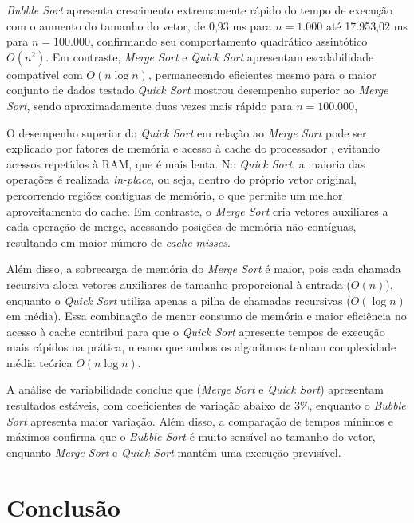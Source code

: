 \documentclass[12pt]{article}
\begin{document}
\textit{Bubble Sort} apresenta crescimento extremamente rápido do tempo de execução com o aumento do tamanho do vetor, de 0,93 ms para $n=1.000$ até 17.953,02 ms para $n=100.000$, confirmando seu comportamento quadrático assintótico $O(n^2)$. Em contraste, \textit{Merge Sort} e \textit{Quick Sort} apresentam escalabilidade compatível com $O(n \log n)$, permanecendo eficientes mesmo para o maior conjunto de dados testado.\textit{Quick Sort} mostrou desempenho superior ao \textit{Merge Sort}, sendo aproximadamente duas vezes mais rápido para $n=100.000$,

O desempenho superior do \textit{Quick Sort} em relação ao \textit{Merge Sort} pode ser explicado por fatores de memória e acesso à cache do processador \cite{prado:2005}, evitando acessos repetidos à RAM, que é mais lenta. No \textit{Quick Sort}, a maioria das operações é realizada \textit{in-place}, ou seja, dentro do próprio vetor original, percorrendo regiões contíguas de memória, o que permite um melhor aproveitamento do cache. Em contraste, o \textit{Merge Sort} cria vetores auxiliares a cada operação de merge, acessando posições de memória não contíguas, resultando em maior número de \textit{cache misses}.

Além disso, a sobrecarga de memória do \textit{Merge Sort} é maior, pois cada chamada recursiva aloca vetores auxiliares de tamanho proporcional à entrada ($O(n)$), enquanto o \textit{Quick Sort} utiliza apenas a pilha de chamadas recursivas ($O(\log n)$ em média). Essa combinação de menor consumo de memória e maior eficiência no acesso à cache contribui para que o \textit{Quick Sort} apresente tempos de execução mais rápidos na prática, mesmo que ambos os algoritmos tenham complexidade média teórica $O(n \log n)$.

A análise de variabilidade conclue que (\textit{Merge Sort} e \textit{Quick Sort}) apresentam resultados estáveis, com coeficientes de variação abaixo de 3\%, enquanto o \textit{Bubble Sort} apresenta maior variação. Além disso, a comparação de tempos mínimos e máximos confirma que o \textit{Bubble Sort} é muito sensível ao tamanho do vetor, enquanto \textit{Merge Sort} e \textit{Quick Sort} mantêm uma execução previsível.

\section{Conclusão}
\end{document}
